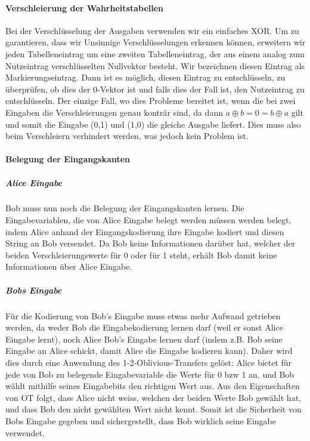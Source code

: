 \documentclass{article}
\begin{document}
\paragraph{Verschleierung der Wahrheitstabellen}
Bei der Verschl\"usselung der Ausgaben verwenden wir ein einfaches XOR.
Um zu garantieren, dass wir Unsinnige Verschl\"usselungen erkennen k\"onnen,
erweitern wir jeden Tabelleneintrag um eine zweiten Tabelleneintrag, der 
aus einem analog zum Nutzeintrag verschl\"usselten Nullvektor besteht.
Wir bezeichnen diesen Eintrag als
Markierungseintrag. Dann ist es m\"oglich, diesen Eintrag
zu entschl\"usseln, zu \"uberpr\"ufen, ob dies der 0-Vektor ist und falls dies
der Fall ist, den Nutzeintrag zu entschl\"usseln. Der einzige Fall, wo dies
Probleme bereitet ist, wenn die bei zwei Eingaben die Verschleierungen 
genau kontr\"ar sind, da dann \(a \oplus b = 0 = b \oplus a\) gilt
und somit die Eingabe (0,1) und (1,0) die gleiche Ausgabe liefert. Dies
muss also beim Verschleiern verhindert werden, was jedoch kein Problem ist.
\paragraph{Belegung der Eingangskanten}
\subparagraph{Alice Eingabe}
Bob muss nun noch die Belegung der Eingangskanten lernen. Die
Eingabevariablen, die von Alice Eingabe belegt werden m\"ussen werden
belegt, indem Alice anhand der Eingangskodierung ihre Eingabe kodiert
und diesen String an Bob versendet. Da Bob keine Informationen dar\"uber
hat, welcher der beiden Verschleierungswerte f\"ur 0 oder f\"ur 1 steht,
erh\"alt Bob damit keine Informationen \"uber Alice Eingabe.
\subparagraph{Bobs Eingabe}
F\"ur die Kodierung von Bob's Eingabe muss etwas mehr Aufwand getrieben
werden, da weder Bob die Eingabekodierung lernen darf (weil er sonst
Alice Eingabe lernt), noch Alice Bob's Eingabe lernen darf (indem z.B.
Bob seine Eingabe an Alice schickt, damit Alice die Eingabe kodieren kann).
Daher wird dies durch eine Anwendung des 1-2-Oblivious-Transfers gel\"ost:
Alice bietet f\"ur jede von Bob zu belegende Eingabevariable die Werte
f\"ur 0 bzw 1 an, und Bob w\"ahlt mithilfe seines Eingabebits den richtigen
Wert aus. Aus den Eigenschaften von OT folgt, dass Alice nicht weiss, welchen
der beiden Werte Bob gew\"ahlt hat, und dass Bob den nicht gew\"ahlten Wert
nicht kennt. Somit ist die Sicherheit von Bobs Eingabe gegeben und 
sichergestellt, dass Bob wirklich seine Eingabe verwendet.
\end{document}
